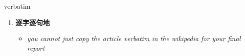 
\begin{frame}
{\huge verbatim}
\begin{center}
\begin{enumerate}\Large
  \item \textbf{逐字逐句地}
  \begin{itemize}
    \item \em{\Large{you cannot just copy the article verbatim in the wikipedia for your final report}}
  \end{itemize}
\end{enumerate}
\end{center}
\end{frame}
